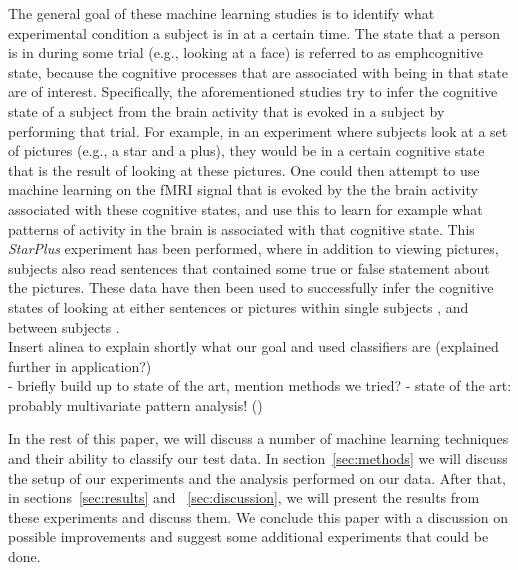 \documentclass[preprint,journal]{vgtc}
\begin{document}
\indent  The general goal of these machine learning studies is to identify what experimental condition a subject is in at a certain time. The state that a person is in during some trial (e.g., looking at a face) is referred to as emph{cognitive state}, because the cognitive processes that are associated with being in that state are of interest. Specifically, the aforementioned studies try to infer the cognitive state of a subject from the brain activity that is evoked in a subject by performing that trial. For example, in an experiment where subjects look at a set of pictures (e.g., a star and a plus), they would be in a certain cognitive state that is the result of looking at these pictures. One could then attempt to use machine learning on the fMRI signal that is evoked by the the brain activity associated with these cognitive states, and use this to learn for example what patterns of activity in the brain is associated with that cognitive state. This \emph{StarPlus} experiment has been performed, where in addition to viewing pictures, subjects also read sentences that contained some true or false statement about the pictures. These data have then been used to successfully infer the cognitive states of looking at either sentences or pictures within single subjects \cite{mi:2003within}, and between subjects \cite{wa:2003betw}. \\
\indent Insert alinea to explain shortly what our goal and used classifiers are (explained further in application?)\\



- briefly build up to state of the art, mention methods we tried?
- state of the art: probably multivariate pattern analysis! (\cite{Haxby2012852})

In the rest of this paper, we will discuss a number of machine learning techniques and their ability to classify our test data. In section~\ref{sec:methods} we will discuss the setup of our experiments and the analysis performed on our data. After that, in sections~\ref{sec:results} and ~\ref{sec:discussion}, we will present the results from these experiments and discuss them. We conclude this paper with a discussion on possible improvements and suggest some additional experiments that could be done.
\end{document}
